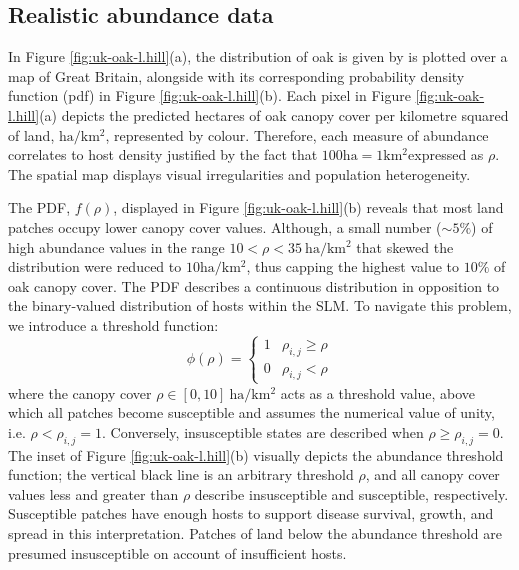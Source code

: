  \newpage

\subsection{Realistic abundance data}

In Figure \ref{fig:uk-oak-l.hill}(a), the distribution of oak is given by \cite{hill.data} is
plotted over a map of Great Britain, alongside with its corresponding 
probability density function (\acrshort{pdf}) in  Figure \ref{fig:uk-oak-l.hill}(b).
Each pixel in Figure \ref{fig:uk-oak-l.hill}(a) depicts the predicted hectares
of oak canopy cover per kilometre squared of land, $\mathrm{ha/km^{2}}$, represented by colour. 
Therefore, each measure of abundance correlates to host density\textemdash
justified by the fact that $100\mathrm{ha} = 1 \mathrm{km^2}$\textemdash expressed as $\rho$.
The spatial map displays visual irregularities and population heterogeneity.

The PDF, $f(\rho)$, displayed in Figure \ref{fig:uk-oak-l.hill}(b) 
reveals that most land patches occupy lower canopy cover values.
Although, a small number ($\sim 5\%$) of high abundance values in the range
$10<\rho<35\ \mathrm{ha/km^2}$ that skewed the distribution were reduced to $10\mathrm{ha/km^2}$, 
thus capping the highest value to $10\%$ of oak canopy cover. 
The PDF describes a continuous distribution in opposition to the binary-valued distribution of hosts 
within the SLM. To navigate this problem, we introduce a threshold function:  
\begin{equation}
  \phi(\rho) =
  \begin{cases}
    1 & \rho_{i,j}\geq\rho \\
    0 & \rho_{i,j}<\rho
  \end{cases}
\end{equation}
where the canopy cover $\rho\in[0, 10]\ \mathrm{ha/km^{2}}$ acts as a threshold value, 
above which all patches become susceptible and assumes the numerical value of unity, i.e. $\rho < \rho_{i,j} = 1$.
Conversely, insusceptible states are described when $\rho \geq \rho_{i,j}= 0$.
The inset of Figure \ref{fig:uk-oak-l.hill}(b) visually depicts the abundance threshold function; 
the vertical black line is an arbitrary threshold $\rho$, and all canopy cover values less and greater than
$\rho$ describe insusceptible and susceptible, respectively.
Susceptible patches have enough hosts to support disease survival, growth, and spread in this interpretation. %
Patches of land below the abundance threshold are presumed insusceptible on account of insufficient hosts.

